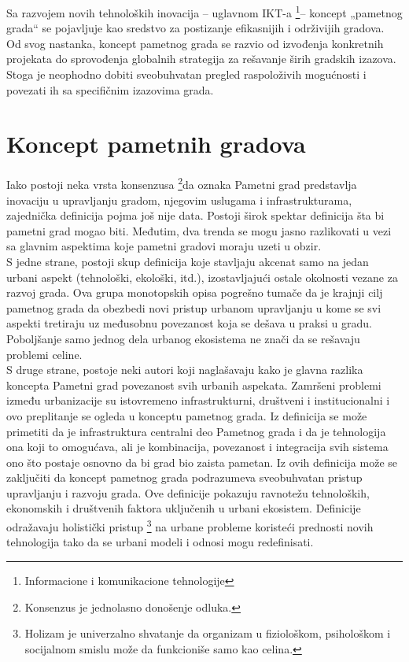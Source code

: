 \documentclass[a4paper,12pt]{article}
\begin{document}
{Sa razvojem novih tehnoloških inovacija – uglavnom IKT-a \footnote{Informacione i komunikacione tehnologije}– koncept „pametnog grada“ se pojavljuje kao sredstvo za postizanje efikasnijih i održivijih gradova. \\

Od svog nastanka, koncept pametnog grada se razvio od izvođenja konkretnih projekata do sprovođenja globalnih strategija za rešavanje širih gradskih izazova. Stoga je neophodno dobiti sveobuhvatan pregled raspoloživih mogućnosti i povezati ih sa specifičnim izazovima grada.


\section{Koncept pametnih gradova}


Iako postoji neka vrsta konsenzusa \footnote{Konsenzus je jednolasno donošenje odluka.}da oznaka Pametni grad predstavlja inovaciju u upravljanju gradom, njegovim uslugama i infrastrukturama, zajednička definicija pojma još nije data. Postoji širok spektar definicija šta bi pametni grad mogao biti. Međutim, dva trenda se mogu jasno razlikovati u vezi sa glavnim aspektima koje pametni gradovi moraju uzeti u obzir. \\

S jedne strane, postoji skup definicija koje stavljaju akcenat samo na jedan urbani aspekt (tehnološki, ekološki, itd.), izostavljajući ostale okolnosti vezane za razvoj grada. Ova grupa monotopskih opisa pogrešno tumače da je krajnji cilj pametnog grada da obezbedi novi pristup urbanom upravljanju u kome se svi aspekti tretiraju uz međusobnu povezanost koja se dešava u praksi u gradu. Poboljšanje samo jednog dela urbanog ekosistema ne znači da se rešavaju problemi celine. \\

S druge strane, postoje neki autori koji naglašavaju kako je glavna razlika koncepta Pametni grad povezanost svih urbanih aspekata. Zamršeni problemi između urbanizacije su istovremeno infrastrukturni, društveni i institucionalni i ovo preplitanje se ogleda u konceptu pametnog grada. Iz definicija se može primetiti da je infrastruktura centralni deo Pametnog grada i da je tehnologija ona koji to omogućava, ali je kombinacija, povezanost i integracija svih sistema ono što postaje osnovno da bi grad bio zaista pametan. Iz ovih definicija može se zaključiti da koncept pametnog grada podrazumeva sveobuhvatan pristup upravljanju i razvoju grada. Ove definicije pokazuju ravnotežu tehnoloških, ekonomskih i društvenih faktora uključenih u urbani ekosistem. Definicije odražavaju holistički pristup \footnote{Holizam je univerzalno shvatanje da organizam u fiziološkom, psihološkom i socijalnom smislu može da funkcioniše samo kao celina. 
} na urbane probleme koristeći prednosti novih tehnologija tako da se urbani modeli i odnosi mogu redefinisati.\\

}
\end{document}
